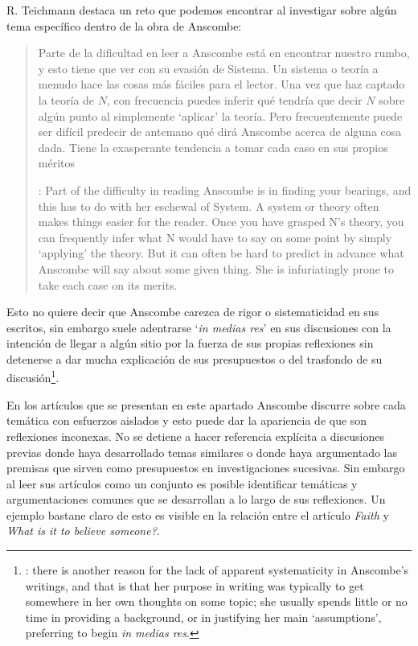 R. Teichmann destaca un reto que podemos encontrar al investigar sobre algún tema específico dentro de la obra de Anscombe:
\blockquote[{\Cite[1]{teichmann2008ans}}: Part of the difficulty in reading Anscombe is in finding your bearings, and this has to do with her eschewal of System. A system or theory often makes things easier for the reader. Once you have grasped N's theory, you can frequently infer what N would have to say on some point by simply `applying' the theory. But it can often be hard to predict in advance what Anscombe will say about some given thing. She is infuriatingly prone to take each case on its merits.]
{Parte de la dificultad en leer a Anscombe está en encontrar nuestro rumbo, y esto tiene que ver con su evasión de Sistema. Un sistema o teoría a menudo hace las cosas más fáciles para el lector. Una vez que haz captado la teoría de $N$, con frecuencia puedes inferir qué tendría que decir $N$ sobre algún punto al simplemente \enquote*{aplicar} la teoría. Pero frecuentemente puede ser difícil predecir de antemano qué dirá Anscombe acerca de alguna cosa dada. Tiene la exasperante tendencia a tomar cada caso en sus propios méritos}. 
Esto no quiere decir que Anscombe carezca de rigor o sistematicidad en sus escritos, sin embargo suele adentrarse \enquote*{\emph{in medias res}} en sus discusiones con la intención de llegar a algún sitio por la fuerza de sus propias reflexiones sin detenerse a dar mucha explicación de sus presupuestos o del trasfondo de su discusión\footnote{\Cite[Cf.][1]{teichmann2008ans}: \textelp{} there is another reason for the lack of apparent systematicity in Anscombe's writings, and that is that her purpose in writing was typically to get somewhere in her own thoughts on some topic; she usually spends little or no time in providing a background, or in justifying her main `assumptions', preferring to begin \emph{in medias res}.}.

En los artículos que se presentan en este apartado Anscombe discurre sobre cada temática con esfuerzos aislados y esto puede dar la apariencia de que son reflexiones inconexas. No se detiene a hacer referencia explícita a discusiones previas donde haya desarrollado temas similares o donde haya argumentado las premisas que sirven como presupuestos en investigaciones sucesivas. Sin embargo al leer sus artículos como un conjunto es posible identificar temáticas y argumentaciones comunes que se desarrollan a lo largo de sus reflexiones. Un ejemplo bastane claro de esto es visible en la relación entre el artículo \emph{Faith} y \emph{What is it to believe someone?}.

